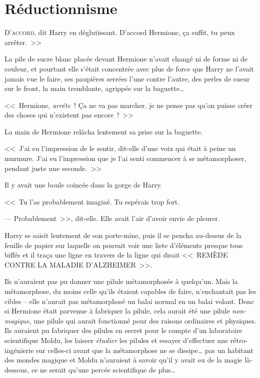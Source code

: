 \chapter{Réductionnisme}

\lettrine[ante=<<~]{D}{'accord}, dit Harry en déglutissant. D'accord Hermione, ça suffit, tu peux arrêter.~>>

La pile de sucre blanc placée devant Hermione n'avait changé ni de forme ni de couleur, et pourtant elle s'était concentrée avec plus de force que Harry ne l'avait jamais vue le faire, ses paupières serrées l'une contre l'autre, des perles de sueur sur le front, la main tremblante, agrippée sur la baguette…

<<~Hermione, \emph{arrête}~! Ça ne va pas marcher, je ne pense pas qu'on puisse créer des choses qui n'existent pas encore~!~>>

La main de Hermione relâcha lentement sa prise sur la baguette.

<<~J'ai eu l'impression de le sentir, dit-elle d'une voix qui était à peine un murmure. J'ai eu l'impression que je l'ai senti commencer à se métamorphoser, pendant juste une seconde.~>>

Il y avait une boule coincée dans la gorge de Harry.

<<~Tu l'as probablement imaginé. Tu espérais trop fort.

--- Probablement~>>, dit-elle. Elle avait l'air d'avoir envie de pleurer.

Harry se saisit lentement de son porte-mine, puis il se pencha au-dessus de la feuille de papier sur laquelle on pouvait voir une liste d'éléments presque tous biffés et il traça une ligne en travers de la ligne qui disait <<~REMÈDE CONTRE LA MALADIE D'ALZHEIMER~>>.

Ils n'auraient pas pu donner une pilule métamorphosée à quelqu'un. Mais la métamorphose, du moins celle qu'ils étaient capables de faire, n'enchantait pas les cibles -- elle n'aurait pas métamorphosé un balai normal en un balai volant. Donc si Hermione était parvenue à fabriquer la pilule, cela aurait été une pilule \emph{non-magique}, une pilule qui aurait fonctionné pour des raisons ordinaires et physiques. Ils auraient pu fabriquer des pilules en secret pour le compte d'un laboratoire scientifique Moldu, les laisser \emph{étudier} les pilules et essayer d'effectuer une rétro-ingénierie sur celles-ci avant que la métamorphose ne se dissipe… pas un habitant des mondes magique et Moldu n'auraient à savoir qu'il y avait eu de la magie là-dessous, ce ne serait qu'une percée scientifique de plus…

